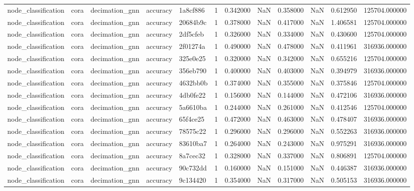 \begin{tabular}{lllllrrrrrrr}
node_classification & cora & decimation_gnn & accuracy & 1a8cf886 & 1 & 0.342000 & NaN & 0.358000 & NaN & 0.612950 & 125704.000000 \\
node_classification & cora & decimation_gnn & accuracy & 20684b9c & 1 & 0.378000 & NaN & 0.417000 & NaN & 1.406581 & 125704.000000 \\
node_classification & cora & decimation_gnn & accuracy & 2df5cfeb & 1 & 0.326000 & NaN & 0.334000 & NaN & 0.430600 & 125704.000000 \\
node_classification & cora & decimation_gnn & accuracy & 2f01274a & 1 & 0.490000 & NaN & 0.478000 & NaN & 0.411961 & 316936.000000 \\
node_classification & cora & decimation_gnn & accuracy & 325e0e25 & 1 & 0.320000 & NaN & 0.342000 & NaN & 0.655216 & 125704.000000 \\
node_classification & cora & decimation_gnn & accuracy & 356eb790 & 1 & 0.400000 & NaN & 0.403000 & NaN & 0.394979 & 316936.000000 \\
node_classification & cora & decimation_gnn & accuracy & 4632bb0b & 1 & 0.374000 & NaN & 0.355000 & NaN & 0.375846 & 125704.000000 \\
node_classification & cora & decimation_gnn & accuracy & 4db0fe22 & 1 & 0.156000 & NaN & 0.144000 & NaN & 0.472106 & 316936.000000 \\
node_classification & cora & decimation_gnn & accuracy & 5a6610ba & 1 & 0.244000 & NaN & 0.261000 & NaN & 0.412546 & 125704.000000 \\
node_classification & cora & decimation_gnn & accuracy & 65f4ce25 & 1 & 0.472000 & NaN & 0.463000 & NaN & 0.478407 & 316936.000000 \\
node_classification & cora & decimation_gnn & accuracy & 78575c22 & 1 & 0.296000 & NaN & 0.296000 & NaN & 0.552263 & 316936.000000 \\
node_classification & cora & decimation_gnn & accuracy & 83610ba7 & 1 & 0.264000 & NaN & 0.243000 & NaN & 0.975291 & 316936.000000 \\
node_classification & cora & decimation_gnn & accuracy & 8a7cec32 & 1 & 0.328000 & NaN & 0.337000 & NaN & 0.806891 & 125704.000000 \\
node_classification & cora & decimation_gnn & accuracy & 90c732dd & 1 & 0.160000 & NaN & 0.151000 & NaN & 0.446387 & 316936.000000 \\
node_classification & cora & decimation_gnn & accuracy & 9c134420 & 1 & 0.354000 & NaN & 0.317000 & NaN & 0.505153 & 316936.000000 \\

\end{tabular}
